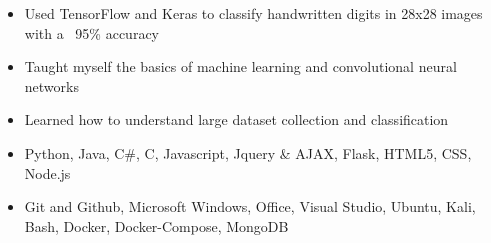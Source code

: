 \documentclass[10pt,a4paper,ragged2e]{altacv}
\begin{document}
\smallskip
\smallskip
{}
\begin{itemize}
\item Used TensorFlow and Keras to classify handwritten digits in 28x28 images with a ~95\% accuracy
\smallskip
\item Taught myself the basics of machine learning and convolutional neural networks
\smallskip
\item Learned how to understand large dataset collection and classification 
\smallskip
\end{itemize}
\cvproject{}

\smallskip
\begin{itemize}
\item Python, Java, C\#, C, Javascript, Jquery \& AJAX, Flask, HTML5, CSS, Node.js
\smallskip
\item Git and Github, Microsoft Windows, Office,  Visual Studio, Ubuntu, Kali, Bash, Docker, Docker-Compose, MongoDB
\end{itemize}


\clearpage


\nocite{*}

\end{document}
